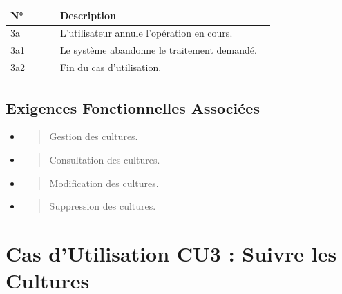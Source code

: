 \begin{longtable}{@{}p{0.18\linewidth}p{0.78\linewidth}@{}}
\toprule
\rowcolors{2}{gray!10}{white}
\textbf{N°} & \textbf{Description} \\
\midrule
\endhead
3a & L'utilisateur annule l'opération en cours. \\
3a1 & Le système abandonne le traitement demandé. \\
3a2 & Fin du cas d'utilisation. \\
\bottomrule
\end{longtable}

\hypertarget{exigences-fonctionnelles-associuxe9es-1}{%
\subsection{Exigences Fonctionnelles
Associées}\label{exigences-fonctionnelles-associuxe9es-1}}

\begin{itemize}
\item
  \begin{quote}
  Gestion des cultures.
  \end{quote}
\item
  \begin{quote}
  Consultation des cultures.
  \end{quote}
\item
  \begin{quote}
  Modification des cultures.
  \end{quote}
\item
  \begin{quote}
  Suppression des cultures.
  \end{quote}
\end{itemize}

\hypertarget{cas-dutilisation-cu3-suivre-les-cultures}{%
\section{Cas d'Utilisation CU3 : Suivre les
Cultures}\label{cas-dutilisation-cu3-suivre-les-cultures}}

